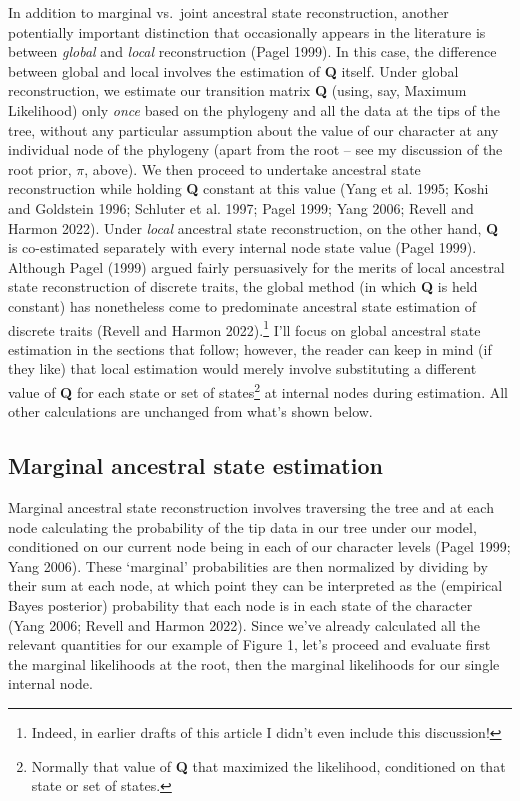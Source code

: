 \documentclass{article}
\begin{document}
In addition to marginal vs.~joint ancestral state reconstruction, another potentially important distinction that occasionally appears in the literature is between \emph{global} and \emph{local} reconstruction (Pagel 1999). In this case, the difference between global and local involves the estimation of \textbf{Q} itself. Under global reconstruction, we estimate our transition matrix \textbf{Q} (using, say, Maximum Likelihood) only \emph{once} based on the phylogeny and all the data at the tips of the tree, without any particular assumption about the value of our character at any individual node of the phylogeny (apart from the root -- see my discussion of the root prior, \(\pi\), above). We then proceed to undertake ancestral state reconstruction while holding \textbf{Q} constant at this value (Yang et al. 1995; Koshi and Goldstein 1996; Schluter et al. 1997; Pagel 1999; Yang 2006; Revell and Harmon 2022). Under \emph{local} ancestral state reconstruction, on the other hand, \textbf{Q} is co-estimated separately with every internal node state value (Pagel 1999). Although Pagel (1999) argued fairly persuasively for the merits of local ancestral state reconstruction of discrete traits, the global method (in which \textbf{Q} is held constant) has nonetheless come to predominate ancestral state estimation of discrete traits (Revell and Harmon 2022).\footnote{Indeed, in earlier drafts of this article I didn't even include this discussion!} I'll focus on global ancestral state estimation in the sections that follow; however, the reader can keep in mind (if they like) that local estimation would merely involve substituting a different value of \textbf{Q} for each state or set of states\footnote{Normally that value of \textbf{Q} that maximized the likelihood, conditioned on that state or set of states.} at internal nodes during estimation. All other calculations are unchanged from what's shown below.

\subsection{Marginal ancestral state estimation}\label{marginal-ancestral-state-estimation}

Marginal ancestral state reconstruction involves traversing the tree and at each node calculating the probability of the tip data in our tree under our model, conditioned on our current node being in each of our character levels (Pagel 1999; Yang 2006). These `marginal' probabilities are then normalized by dividing by their sum at each node, at which point they can be interpreted as the (empirical Bayes posterior) probability that each node is in each state of the character (Yang 2006; Revell and Harmon 2022). Since we've already calculated all the relevant quantities for our example of Figure 1, let's proceed and evaluate first the marginal likelihoods at the root, then the marginal likelihoods for our single internal node.
\end{document}
